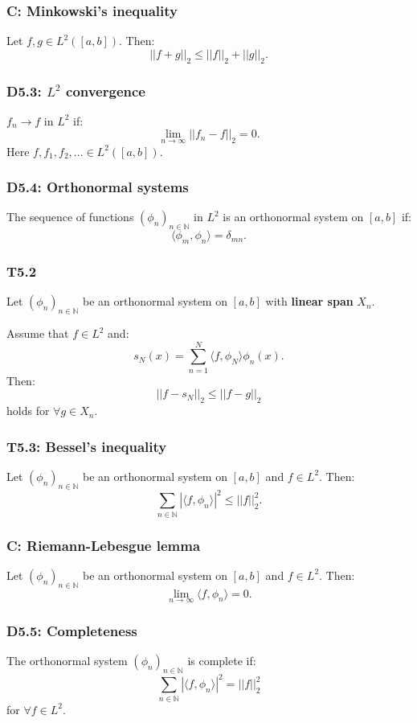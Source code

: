 \documentclass{article}
\begin{document}
\begin{multicols*}{3}
\subsubsection*{C: Minkowski's inequality}
Let $f,g\in L^2([a,b])$. Then:
$$||f+g||_2\leq||f||_2+||g||_2.$$

\subsubsection*{D5.3: $L^2$ convergence}
$f_n\rightarrow f$ in $L^2$ if:
$$\lim_{n\rightarrow\infty}||f_n-f||_2=0.$$
Here $f,f_1,f_2,\ldots\in L^2([a,b])$.

\subsubsection*{D5.4: Orthonormal systems}
The sequence of functions $(\phi_n)_{n\in\mathbb{N}}$ 
in $L^2$ is an orthonormal system on $[a,b]$ if:
$$\langle\phi_m,\phi_n \rangle=\delta_{mn}.$$

\subsubsection*{T5.2}
Let $(\phi_n)_{n\in\mathbb{N}}$ be an
orthonormal system on $[a,b]$ with
\textbf{linear span} $X_n$. 

Assume that $f\in L^2$ and:
$$s_N(x)=\sum_{n=1}^{N}
\langle f,\phi_N\rangle\phi_n(x).$$
Then:
$$||f-s_N||_2\leq||f-g||_2$$
holds for $\forall g\in X_n$.

\subsubsection*{T5.3: Bessel's inequality}
Let $(\phi_n)_{n\in\mathbb{N}}$ be an
orthonormal system on $[a,b]$ and $f\in L^2$.
Then:
$$\sum_{n\in\mathbb{N}}|
\langle f,\phi_n\rangle|^2
\leq||f||_2^2.$$

\subsubsection*{C: Riemann-Lebesgue lemma}
Let $(\phi_n)_{n\in\mathbb{N}}$ be an
orthonormal system on $[a,b]$ and $f\in L^2$.
Then:
$$\lim_{n\rightarrow\infty}\langle f,\phi_n\rangle=0.$$

\subsubsection*{D5.5: Completeness}
The orthonormal system $(\phi_n)_{n\in\mathbb{N}}$ 
is complete if:
$$\sum_{n\in\mathbb{N}}|
\langle f,\phi_n\rangle|^2=||f||_2^2$$
for $\forall f\in L^2$.


\end{multicols*}
\end{document}
